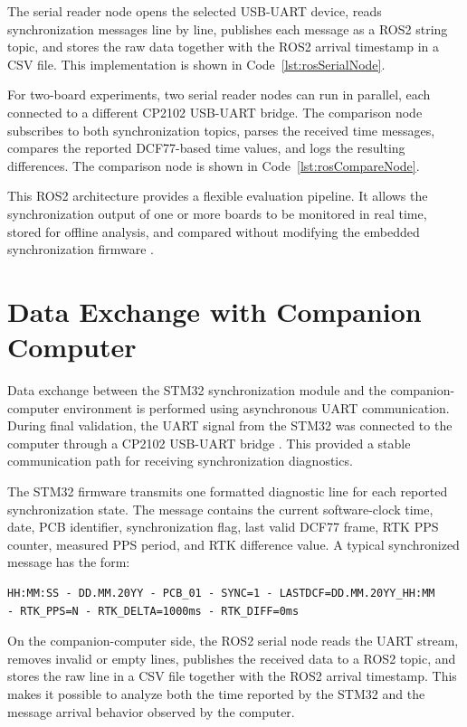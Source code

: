 The serial reader node opens the selected USB-UART device, reads synchronization messages line by line, publishes each message as a ROS2 string topic, and stores the raw data together with the ROS2 arrival timestamp in a CSV file. This implementation is shown in Code~\ref{lst:rosSerialNode}.

For two-board experiments, two serial reader nodes can run in parallel, each connected to a different CP2102 USB-UART bridge. The comparison node subscribes to both synchronization topics, parses the received time messages, compares the reported DCF77-based time values, and logs the resulting differences. The comparison node is shown in Code~\ref{lst:rosCompareNode}.

This ROS2 architecture provides a flexible evaluation pipeline. It allows the synchronization output of one or more boards to be monitored in real time, stored for offline analysis, and compared without modifying the embedded synchronization firmware \cite{ros2Docs}.

\section{Data Exchange with Companion Computer}

Data exchange between the STM32 synchronization module and the companion-computer environment is performed using asynchronous UART communication. During final validation, the UART signal from the STM32 was connected to the computer through a CP2102 USB-UART bridge \cite{cp2102Datasheet}. This provided a stable communication path for receiving synchronization diagnostics.

The STM32 firmware transmits one formatted diagnostic line for each reported synchronization state. The message contains the current software-clock time, date, PCB identifier, synchronization flag, last valid DCF77 frame, RTK PPS counter, measured PPS period, and RTK difference value. A typical synchronized message has the form:
\begin{verbatim}
HH:MM:SS - DD.MM.20YY - PCB_01 - SYNC=1 - LASTDCF=DD.MM.20YY_HH:MM
- RTK_PPS=N - RTK_DELTA=1000ms - RTK_DIFF=0ms
\end{verbatim}
On the companion-computer side, the ROS2 serial node reads the UART stream, removes invalid or empty lines, publishes the received data to a ROS2 topic, and stores the raw line in a CSV file together with the ROS2 arrival timestamp. This makes it possible to analyze both the time reported by the STM32 and the message arrival behavior observed by the computer.

